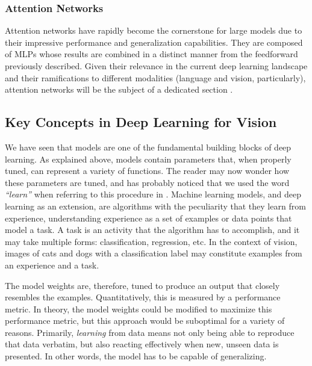 \subsubsection{Attention Networks}
Attention networks have rapidly become the cornerstone for large models due to their impressive performance and generalization capabilities. They are composed of MLPs whose results are combined in a distinct manner from the feedforward previously described. Given their relevance in the current deep learning landscape and their ramifications to different modalities (language and vision, particularly), attention networks will be the subject of a dedicated section .

\subsection{Key Concepts in Deep Learning for Vision}

We have seen that models are one of the fundamental building blocks of deep learning. As explained above, models contain parameters that, when properly tuned, can represent a variety of functions. The reader may now wonder how these parameters are tuned, and has probably noticed that we used the word \textit{``learn''} when referring to this procedure in . Machine learning models, and deep learning as an extension, are algorithms with the peculiarity that they learn from experience, understanding experience as a set of examples or data points that model a task. A task is an activity that the algorithm has to accomplish, and it may take multiple forms: classification, regression, etc. In the context of vision, images of cats and dogs with a classification label may constitute examples from an experience and a task.

The model weights are, therefore, tuned to produce an output that closely resembles the examples. Quantitatively, this is measured by a performance metric. In theory, the model weights could be modified to maximize this performance metric, but this approach would be suboptimal for a variety of reasons. Primarily, \textit{learning} from data means not only being able to reproduce that data verbatim, but also reacting effectively when new, unseen data is presented. In other words, the model has to be capable of generalizing.

